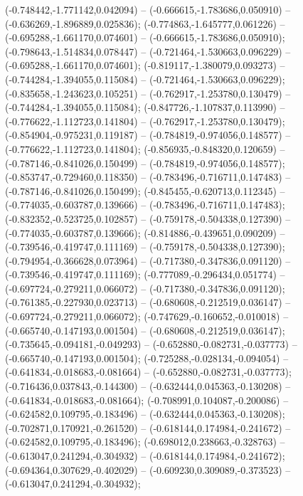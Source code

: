  (-0.748442,-1.771142,0.042094) -- (-0.666615,-1.783686,0.050910) -- (-0.636269,-1.896889,0.025836);
 (-0.774863,-1.645777,0.061226) -- (-0.695288,-1.661170,0.074601) -- (-0.666615,-1.783686,0.050910);
 (-0.798643,-1.514834,0.078447) -- (-0.721464,-1.530663,0.096229) -- (-0.695288,-1.661170,0.074601);
 (-0.819117,-1.380079,0.093273) -- (-0.744284,-1.394055,0.115084) -- (-0.721464,-1.530663,0.096229);
 (-0.835658,-1.243623,0.105251) -- (-0.762917,-1.253780,0.130479) -- (-0.744284,-1.394055,0.115084);
 (-0.847726,-1.107837,0.113990) -- (-0.776622,-1.112723,0.141804) -- (-0.762917,-1.253780,0.130479);
 (-0.854904,-0.975231,0.119187) -- (-0.784819,-0.974056,0.148577) -- (-0.776622,-1.112723,0.141804);
 (-0.856935,-0.848320,0.120659) -- (-0.787146,-0.841026,0.150499) -- (-0.784819,-0.974056,0.148577);
 (-0.853747,-0.729460,0.118350) -- (-0.783496,-0.716711,0.147483) -- (-0.787146,-0.841026,0.150499);
 (-0.845455,-0.620713,0.112345) -- (-0.774035,-0.603787,0.139666) -- (-0.783496,-0.716711,0.147483);
 (-0.832352,-0.523725,0.102857) -- (-0.759178,-0.504338,0.127390) -- (-0.774035,-0.603787,0.139666);
 (-0.814886,-0.439651,0.090209) -- (-0.739546,-0.419747,0.111169) -- (-0.759178,-0.504338,0.127390);
 (-0.794954,-0.366628,0.073964) -- (-0.717380,-0.347836,0.091120) -- (-0.739546,-0.419747,0.111169);
 (-0.777089,-0.296434,0.051774) -- (-0.697724,-0.279211,0.066072) -- (-0.717380,-0.347836,0.091120);
 (-0.761385,-0.227930,0.023713) -- (-0.680608,-0.212519,0.036147) -- (-0.697724,-0.279211,0.066072);
 (-0.747629,-0.160652,-0.010018) -- (-0.665740,-0.147193,0.001504) -- (-0.680608,-0.212519,0.036147);
 (-0.735645,-0.094181,-0.049293) -- (-0.652880,-0.082731,-0.037773) -- (-0.665740,-0.147193,0.001504);
 (-0.725288,-0.028134,-0.094054) -- (-0.641834,-0.018683,-0.081664) -- (-0.652880,-0.082731,-0.037773);
 (-0.716436,0.037843,-0.144300) -- (-0.632444,0.045363,-0.130208) -- (-0.641834,-0.018683,-0.081664);
 (-0.708991,0.104087,-0.200086) -- (-0.624582,0.109795,-0.183496) -- (-0.632444,0.045363,-0.130208);
 (-0.702871,0.170921,-0.261520) -- (-0.618144,0.174984,-0.241672) -- (-0.624582,0.109795,-0.183496);
 (-0.698012,0.238663,-0.328763) -- (-0.613047,0.241294,-0.304932) -- (-0.618144,0.174984,-0.241672);
 (-0.694364,0.307629,-0.402029) -- (-0.609230,0.309089,-0.373523) -- (-0.613047,0.241294,-0.304932);
